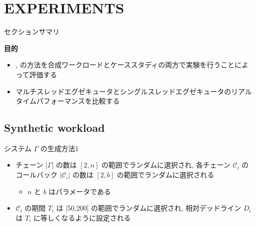 
\section{EXPERIMENTS}
\label{sec: experiments}

\begin{frame}{セクションサマリ}
    \begin{itembox}[l]{\textbf{目的}}
        \begin{itemize}
            \item {},  の方法を合成ワークロードとケーススタディの両方で実験を行うことによって評価する
            \item マルチスレッドエグゼキュータとシングルスレッドエグゼキュータのリアルタイムパフォーマンスを比較する
        \end{itemize}
    \end{itembox}
\end{frame}

\subsection{Synthetic workload}
\label{ssec: synthetic workload}

\begin{frame}{システム $\Gamma$ の生成方法1}
    \begin{itemize}
        \item チェーン $|\Gamma|$ の数は $[2, n]$ の範囲でランダムに選択され, 各チェーン $\mathcal{C}_{i}$ のコールバック $\left|\mathcal{C}_{i}\right|$ の数は $[2, b]$ の範囲でランダムに選択される
              \begin{itemize}
                  \item $n$ と $b$ はパラメータである
              \end{itemize}
        \item $\mathcal{C}_{i}$ の期間 $T_{i}$ は [50,200] の範囲でランダムに選択され, 相対デッドライン $D_{i}$ は $T_{i}$ に等しくなるように設定される
    \end{itemize}
\end{frame}

